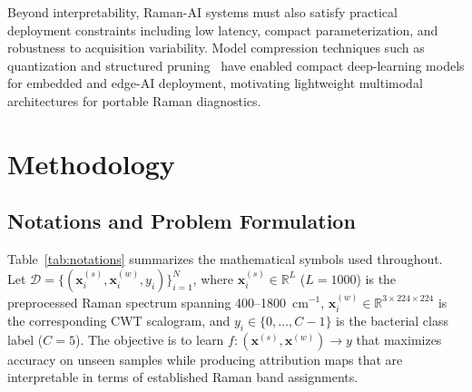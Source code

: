 \documentclass[preprint,12pt]{elsarticle}
\begin{document}
Beyond interpretability, Raman-AI systems must also satisfy practical
deployment constraints including low latency, compact parameterization,
and robustness to acquisition variability. Model compression
techniques such as quantization and structured
pruning~\cite{han2016deep,jacob2018quantization} have enabled compact
deep-learning models for embedded and edge-AI deployment, motivating
lightweight multimodal architectures for portable Raman diagnostics.
\section{Methodology}
\label{sec:methods}

\subsection{Notations and Problem Formulation}
\label{ssec:notation}

Table~\ref{tab:notations} summarizes the mathematical symbols used
throughout. Let $\mathcal{D}=\{(\mathbf{x}_i^{(s)},\mathbf{x}_i^{(w)},
y_i)\}_{i=1}^{N}$, where $\mathbf{x}_i^{(s)}\in\mathbb{R}^{L}$
($L=1000$) is the preprocessed Raman spectrum spanning
400--1800~cm$^{-1}$, $\mathbf{x}_i^{(w)}\in\mathbb{R}^{3\times224\times224}$
is the corresponding CWT scalogram, and $y_i\in\{0,\ldots,C{-}1\}$
is the bacterial class label ($C=5$). The objective is to learn
$f:(\mathbf{x}^{(s)},\mathbf{x}^{(w)})\rightarrow y$ that maximizes
accuracy on unseen samples while producing attribution maps that are
interpretable in terms of established Raman band assignments.
\end{document}
